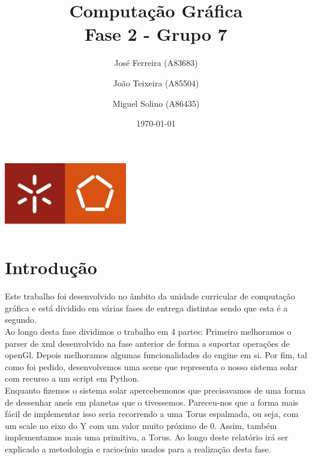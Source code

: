 \documentclass[a4paper]{report}
\begin{document}
\title{Computação Gráfica\\
\large Fase 2 - Grupo 7}
\author{José Ferreira (A83683) \and João Teixeira (A85504) \and Miguel Solino (A86435)}
\date{\today}

\begin{center}
    \begin{minipage}{0.75\linewidth}
        \centering
        \includegraphics[width=0.4\textwidth]{images/eng.jpeg}\par\vspace{1cm}
        \vspace{1.5cm}
        \href{https://www.uminho.pt/PT}
        {\color{black}{\scshape\LARGE Universidade do Minho}} \par
        \vspace{1cm}
        \href{https://www.di.uminho.pt/}
        {\color{black}{\scshape\Large Departamento de Informática}} \par
        \vspace{1.5cm}
        \maketitle
    \end{minipage}
\end{center}

\tableofcontents

\chapter{Introdução}
Este trabalho foi desenvolvido no âmbito da unidade curricular de computação
gráfica e está dividido em várias fases de entrega distintas sendo que esta é a
segundo.\\
Ao longo desta fase dividimos o trabalho em 4 partes:
Primeiro melhoramos o parser de xml desenvolvido na fase anterior de forma a
suportar operações de openGl. Depois melhoramos algumas funcionalidades do
engine em si. Por fim, tal como foi pedido, desenvolvemos uma scene que
representa o nosso sistema solar com recurso a um script em Python.\\
Enquanto fizemos o sistema solar apercebemonos que precisavamos de uma forma de
dessenhar aneís em planetas que o tivessemos. Pareceu-nos que a forma mais fácil
de implementar isso seria recorrendo a uma Torus espalmada, ou seja, com um
scale no eixo do Y com um valor muito próximo de 0. Assim, também implementamos
mais uma primitiva, a Torus.
Ao longo deste relatório irá ser explicado a metodologia e raciocínio usados
para a realização desta fase.\\
\end{document}
